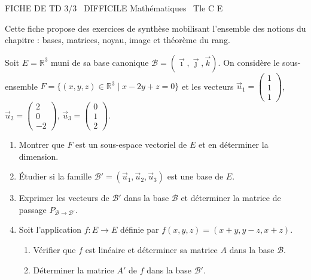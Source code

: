 \documentclass[11pt]{article}
\begin{document}
\begin{tcolorbox}[enhanced,colback=popink,colframe=popink,arc=10pt,boxrule=0pt,left=12pt,right=12pt,top=9pt,bottom=9pt]
{\color{white}\popxbold\small FICHE DE TD 3/3 \textbullet\ DIFFICILE \hfill Mathématiques \textbullet\ Tle C E\par}
\end{tcolorbox}
\vspace{4pt}
Cette fiche propose des exercices de synthèse mobilisant l'ensemble des notions du chapitre : bases, matrices, noyau, image et théorème du rang.

\begin{exercice}
Soit $E = \mathbb{R}^3$ muni de sa base canonique $\mathcal{B} = (\vec{\imath}, \vec{\jmath}, \vec{k})$.
On considère le sous-ensemble $F = \{(x,y,z) \in \mathbb{R}^3 \mid x - 2y + z = 0\}$ et les vecteurs
$\vec{u}_1 = \begin{pmatrix} 1 \\ 1 \\ 1 \end{pmatrix}$, $\vec{u}_2 = \begin{pmatrix} 2 \\ 0 \\ -2 \end{pmatrix}$, $\vec{u}_3 = \begin{pmatrix} 0 \\ 1 \\ 2 \end{pmatrix}$.
\begin{enumerate}
    \item Montrer que $F$ est un sous-espace vectoriel de $E$ et en déterminer la dimension.
    \item Étudier si la famille $\mathcal{B}' = (\vec{u}_1, \vec{u}_2, \vec{u}_3)$ est une base de $E$.
    \item Exprimer les vecteurs de $\mathcal{B}'$ dans la base $\mathcal{B}$ et déterminer la matrice de passage $P_{\mathcal{B} \to \mathcal{B}'}$.
    \item Soit l'application $f : E \to E$ définie par $f(x,y,z) = (x+y, y-z, x+z)$.
    \begin{enumerate}
        \item Vérifier que $f$ est linéaire et déterminer sa matrice $A$ dans la base $\mathcal{B}$.
        \item Déterminer la matrice $A'$ de $f$ dans la base $\mathcal{B}'$.
    \end{enumerate}
\end{enumerate}
\end{exercice}
\end{document}
